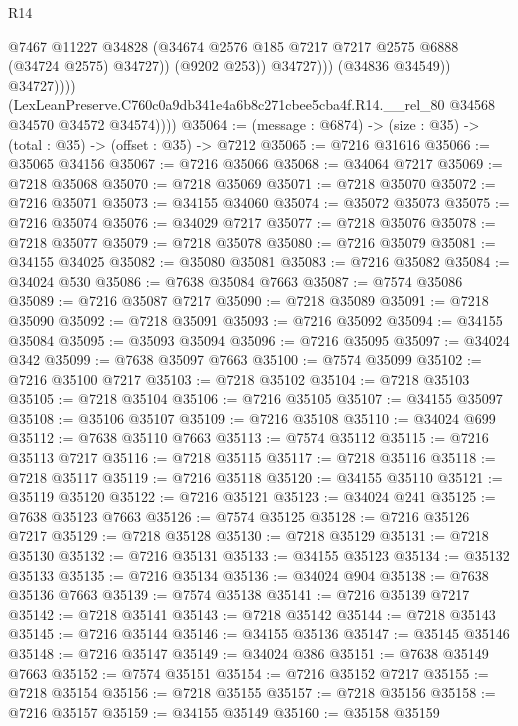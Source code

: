 \begin{lexlean}{R14}
\begin{coremodule}
                              @7467
                              @11227
                              @34828
                              (@34674 @2576 @185 @7217 @7217 @2575 @6888 (@34724 @2575) @34727))
                            (@9202 @253))
                          @34727)))
                    (@34836 @34549))
                  @34727))))
          (LexLeanPreserve.C760c0a9db341e4a6b8c271cbee5cba4f.R14.__rel_80
            @34568
            @34570
            @34572
            @34574))))
@35064 := (message : @6874) -> (size : @35) -> (total : @35) -> (offset : @35) -> @7212
@35065 := @7216 @31616
@35066 := @35065 @34156
@35067 := @7216 @35066
@35068 := @34064 @7217
@35069 := @7218 @35068
@35070 := @7218 @35069
@35071 := @7218 @35070
@35072 := @7216 @35071
@35073 := @34155 @34060
@35074 := @35072 @35073
@35075 := @7216 @35074
@35076 := @34029 @7217
@35077 := @7218 @35076
@35078 := @7218 @35077
@35079 := @7218 @35078
@35080 := @7216 @35079
@35081 := @34155 @34025
@35082 := @35080 @35081
@35083 := @7216 @35082
@35084 := @34024 @530
@35086 := @7638 @35084 @7663
@35087 := @7574 @35086
@35089 := @7216 @35087 @7217
@35090 := @7218 @35089
@35091 := @7218 @35090
@35092 := @7218 @35091
@35093 := @7216 @35092
@35094 := @34155 @35084
@35095 := @35093 @35094
@35096 := @7216 @35095
@35097 := @34024 @342
@35099 := @7638 @35097 @7663
@35100 := @7574 @35099
@35102 := @7216 @35100 @7217
@35103 := @7218 @35102
@35104 := @7218 @35103
@35105 := @7218 @35104
@35106 := @7216 @35105
@35107 := @34155 @35097
@35108 := @35106 @35107
@35109 := @7216 @35108
@35110 := @34024 @699
@35112 := @7638 @35110 @7663
@35113 := @7574 @35112
@35115 := @7216 @35113 @7217
@35116 := @7218 @35115
@35117 := @7218 @35116
@35118 := @7218 @35117
@35119 := @7216 @35118
@35120 := @34155 @35110
@35121 := @35119 @35120
@35122 := @7216 @35121
@35123 := @34024 @241
@35125 := @7638 @35123 @7663
@35126 := @7574 @35125
@35128 := @7216 @35126 @7217
@35129 := @7218 @35128
@35130 := @7218 @35129
@35131 := @7218 @35130
@35132 := @7216 @35131
@35133 := @34155 @35123
@35134 := @35132 @35133
@35135 := @7216 @35134
@35136 := @34024 @904
@35138 := @7638 @35136 @7663
@35139 := @7574 @35138
@35141 := @7216 @35139 @7217
@35142 := @7218 @35141
@35143 := @7218 @35142
@35144 := @7218 @35143
@35145 := @7216 @35144
@35146 := @34155 @35136
@35147 := @35145 @35146
@35148 := @7216 @35147
@35149 := @34024 @386
@35151 := @7638 @35149 @7663
@35152 := @7574 @35151
@35154 := @7216 @35152 @7217
@35155 := @7218 @35154
@35156 := @7218 @35155
@35157 := @7218 @35156
@35158 := @7216 @35157
@35159 := @34155 @35149
@35160 := @35158 @35159

\end{coremodule}
\end{lexlean}
